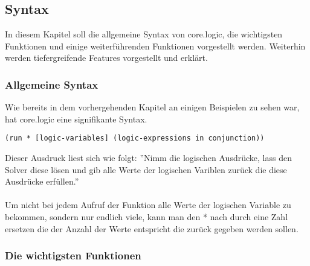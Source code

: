 \subsection{Syntax}

In diesem Kapitel soll die allgemeine Syntax von core.logic, die wichtigsten Funktionen und einige weiterführenden Funktionen vorgestellt werden. Weiterhin werden tiefergreifende Features vorgestellt und erklärt.

\subsubsection{Allgemeine Syntax}

Wie bereits in dem vorhergehenden Kapitel an einigen Beispielen zu sehen war, hat core.logic eine signifikante Syntax.
\begin{lstlisting}
(run * [logic-variables] (logic-expressions in conjunction))
\end{lstlisting}
Dieser Ausdruck liest sich wie folgt: ''Nimm die logischen Ausdrücke, lass den Solver diese lösen und gib alle Werte der logischen Variblen zurück die diese Ausdrücke erfüllen.''\\
\\
Um nicht bei jedem Aufruf der  Funktion alle Werte der logischen Variable zu bekommen, sondern nur endlich viele, kann man den * nach  durch eine Zahl ersetzen die der Anzahl der Werte entspricht die zurück gegeben werden sollen.

\subsubsection{Die wichtigsten Funktionen}

